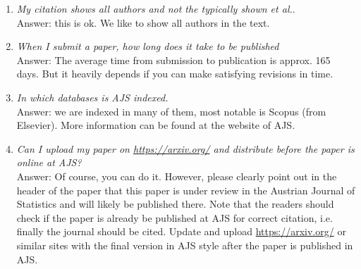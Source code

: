 \documentclass[article]{ajs}
\begin{document}
\noindent 
\begin{enumerate}
\item \textit{My citation shows all authors and not the typically shown et al.}. \\ Answer: this is ok. We like to show all authors in the text.
\item \textit{When I submit a paper, how long does it take to be published} \\ Answer: The average time from submission to publication is approx. 165 days. But it heavily depends if you can make satisfying revisions in time. 
\item \textit{In which databases is AJS indexed.} \\
Answer: we are indexed in many of them, most notable is Scopus (from Elsevier). More information can be found at the website of AJS. 
\item \textit{Can I upload my paper on \href{https://arxiv.org/}{https://arxiv.org/} and distribute before the paper is online at AJS? } \\
Answer: Of course, you can do it. However, please clearly point out in the header of the paper that this paper is under review in the Austrian Journal of Statistics and will likely be published there. Note that the readers should check if the paper is already be published at AJS for correct citation, i.e. finally the journal should be cited. Update and upload  \href{https://arxiv.org/}{https://arxiv.org/} or similar sites with the final version in AJS style after the paper is published  in AJS. 

\end{enumerate}



%

\end{document}

